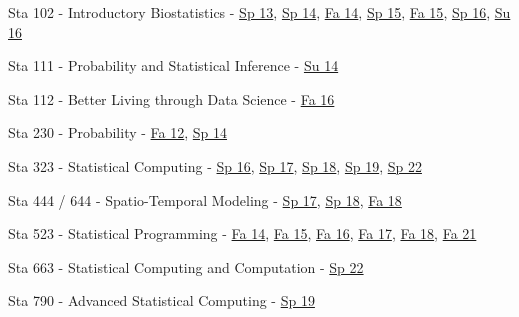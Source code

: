\documentclass[margin,line]{res}
\begin{document}
\begin{resume}
\begin{list1}
\item[] Sta 102 - Introductory Biostatistics - \href{http://stat.duke.edu/courses/Spring13/sta102.001/}{Sp 13}, \href{https://stat.duke.edu/~cr173/Sta102_Sp14/}{Sp 14}, \href{https://stat.duke.edu/~cr173/Sta102_Fa14/}{Fa 14}, \href{https://stat.duke.edu/~cr173/Sta102_Sp15/}{Sp 15}, \href{https://stat.duke.edu/~cr173/Sta102_Fa15/}{Fa 15}, \href{http://stat.duke.edu/~cr173/Sta112_Sp16/}{Sp 16}, \href{http://stat.duke.edu/~cr173/Sta102_Su16/}{Su 16}

\item[] Sta 111 - Probability and Statistical Inference - \href{https://stat.duke.edu/~cr173/Sta111_Su14/}{Su 14}

\item[] Sta 112 - Better Living through Data Science - \href{http://stat.duke.edu/~cr173/Sta112_Fa16/}{Fa 16}

\item[] Sta 230 - Probability - \href{http://stat.duke.edu/courses/Spring12/sta104.1}{Fa 12}, \href{https://stat.duke.edu/~cr173/Sta230_Sp14/}{Sp 14}

\item[] Sta 323 - Statistical Computing - \href{http://stat.duke.edu/~cr173/Sta323_Sp16/}{Sp 16}, \href{http://stat.duke.edu/~cr173/Sta323_Sp17/}{Sp 17}, \href{http://stat.duke.edu/~cr173/Sta323_Sp18/}{Sp 18}, \href{http://stat.duke.edu/~cr173/Sta323_Sp19/}{Sp 19}, \href{https://sta323-sp22.github.io/}{Sp 22}

\item[] Sta 444 / 644 - Spatio-Temporal Modeling - \href{http://stat.duke.edu/~cr173/Sta444_Sp17/}{Sp 17}, \href{http://stat.duke.edu/~cr173/Sta444_Sp18/}{Sp 18}, \href{http://stat.duke.edu/~cr173/Sta444_Fa18/}{Fa 18}

\item[] Sta 523 - Statistical Programming - \href{https://stat.duke.edu/~cr173/Sta523_Fa14/}{Fa 14}, \href{https://stat.duke.edu/~cr173/Sta523_Fa15/}{Fa 15}, \href{https://stat.duke.edu/~cr173/Sta523_Fa16/}{Fa 16}, \href{https://stat.duke.edu/~cr173/Sta523_Fa17/}{Fa 17}, \href{https://stat.duke.edu/~cr173/Sta523_Fa18/}{Fa 18},
\href{https://sta523-fa21.github.io/}{Fa 21}

\item[] Sta 663 - Statistical Computing and Computation - \href{https://sta663-sp22.github.io/}{Sp 22}


\item[] Sta 790 - Advanced Statistical Computing - \href{http://stat.duke.edu/~cr173/Sta790_Sp16/}{Sp 19}
\end{list1}


\end{resume}
\end{document}
